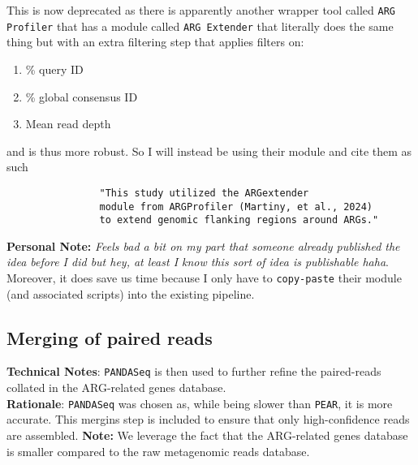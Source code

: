 \documentclass[11pt]{report}
\begin{document}
\begin{tcolorbox}[title=Sep 22 2024 Update, coltitle=AntiqueWhite1]
	This is now deprecated as there is apparently another wrapper tool called \texttt{ARG Profiler} that has a module called \texttt{ARG Extender} that literally does the same thing but with an extra filtering step that applies filters on:
		\begin{enumerate}
			\item \% query ID
			\item \% global consensus ID
			\item Mean read depth 
		\end{enumerate}
		and is thus more robust. So I will instead be using their module and cite them as such 
			\begin{verbatim}
				"This study utilized the ARGextender 
				module from ARGProfiler (Martiny, et al., 2024) 
				to extend genomic flanking regions around ARGs."
			\end{verbatim}
	\textbf{Personal Note: }\textit{Feels bad a bit on my part that someone already published the idea before I did but hey, at least I know this sort of idea is publishable haha}. Moreover, it does save us time because I only have to \texttt{copy-paste} their module (and associated scripts) into the existing pipeline.

\end{tcolorbox}

	
\subsection{Merging of paired reads}
\textbf{Technical Notes}: \texttt{PANDASeq} is then used to further refine the paired-reads collated in the ARG-related genes database. \\
\textbf{Rationale}: \texttt{PANDASeq} was chosen as, while being slower than \texttt{PEAR}, it is more accurate. This mergins step is included to ensure that only high-confidence reads are assembled. 
\textbf{Note:} We leverage the fact that the ARG-related genes database is smaller compared to the raw metagenomic reads database.
	
\end{document}
